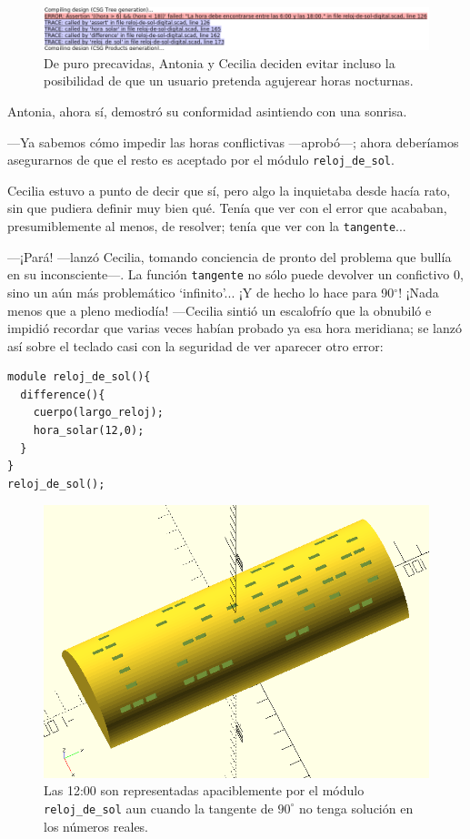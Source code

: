 \begin{figure}[ht]
  \centering
  \includegraphics[width=1\textwidth]{imagenes/assert-4}  
  \caption{De puro precavidas, Antonia y Cecilia deciden evitar
    incluso la posibilidad de que un usuario pretenda agujerear horas
    nocturnas.}
  \label{fig:assert-4}
\end{figure}


Antonia, ahora sí, demostró su conformidad asintiendo con una
sonrisa.

---Ya sabemos cómo impedir las horas conflictivas ---a\-pro\-bó---; ahora deberíamos asegurarnos de que el resto es
aceptado por el módulo \lstinline!reloj_de_sol!.

Cecilia estuvo a punto de decir que sí, pero algo la inquietaba desde
hacía rato, sin que pudiera definir muy bien qué. Tenía que ver con el
error que acababan, presumiblemente al menos, de resolver; tenía que
ver con la \lstinline!tangente!...

---¡Pará! ---lanzó Cecilia, tomando conciencia de pronto del problema
que bullía en su inconsciente---. La función \lstinline!tangente! no
sólo puede devolver un confictivo 0, sino un aún más problemático
`infinito'... ¡Y de hecho lo hace para 90$^{\circ}$! ¡Nada menos que a
pleno mediodía! ---Cecilia sintió un escalofrío que la obnubiló e
impidió recordar que varias veces habían probado ya esa hora
meridiana; se lanzó así sobre el teclado casi con la seguridad de ver
aparecer otro error:

\begin{lstlisting}
module reloj_de_sol(){
  difference(){
    cuerpo(largo_reloj);
    hora_solar(12,0);
  }
}
reloj_de_sol();
\end{lstlisting}%

\begin{figure}[ht]
  \centering
  \includegraphics[width=.75\textwidth]{imagenes/12_00-a}  
  \caption{Las 12:00 son representadas apaciblemente por el módulo
    \lstinline!reloj_de_sol! aun cuando la tangente de $90^{\circ}$ no
    tenga solución en los números reales.}
  \label{fig:12_00-a}
\end{figure}

